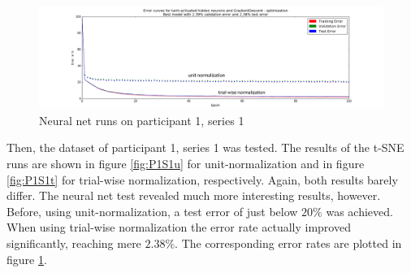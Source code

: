 \documentclass{article} %
\begin{document}
\begin{figure}[h]
	\centering
	\hspace*{-1.7cm}
	\includegraphics[width=1.25\textwidth]{P1S1_double.png}
	\caption{Neural net runs on participant 1, series 1}
	\label{fig:P1S1_double}
\end{figure}
Then, the dataset of participant 1, series 1 was tested. The results of the t-SNE runs are shown in figure \ref{fig:P1S1u} for unit-normalization and in figure \ref{fig:P1S1t} for trial-wise normalization, respectively. Again, both results barely differ. The neural net test revealed much more interesting results, however. Before, using unit-normalization, a test error of just below $20\%$ was achieved. When using trial-wise normalization the error rate actually improved significantly, reaching mere $2.38\%$. The corresponding error rates are plotted in figure \ref{fig:P1S1_double}.
\end{document}
